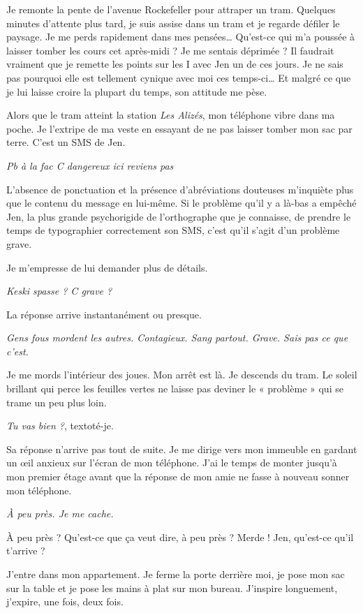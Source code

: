 Je remonte la pente de l'avenue Rockefeller pour attraper un tram. Quelques minutes d'attente plus tard, je suis assise dans un tram et je regarde défiler le paysage. Je me perds rapidement dans mes pensées… Qu'est-ce qui m'a poussée à laisser tomber les cours cet après-midi ? Je me sentais déprimée ? Il faudrait vraiment que je remette les points sur les I avec Jen un de ces jours. Je ne sais pas pourquoi elle est tellement cynique avec moi ces temps-ci… Et malgré ce que je lui laisse croire la plupart du temps, son attitude me pèse.

Alors que le tram atteint la station \textit{Les Alizés}, mon téléphone vibre dans ma poche. Je l'extripe de ma veste en essayant de ne pas laisser tomber mon sac par terre. C'est un SMS de Jen.

\textit{Pb à la fac C dangereux ici reviens pas}

L'absence de ponctuation et la présence d'abréviations douteuses m'inquiète plus que le contenu du message en lui-même. Si le problème qu'il y a là-bas a empêché Jen, la plus grande psychorigide de l'orthographe que je connaisse, de prendre le temps de typographier correctement son SMS, c'est qu'il s'agit d'un problème grave.

Je m'empresse de lui demander plus de détails.

\textit{Keski spasse ? C grave ?}

La réponse arrive instantanément ou presque.

\textit{Gens fous mordent les autres. Contagieux. Sang partout. Grave. Sais pas ce que c'est.}

Je me mords l'intérieur des joues. Mon arrêt est là. Je descends du tram. Le soleil brillant qui perce les feuilles vertes ne laisse pas deviner le « problème » qui se trame un peu plus loin.

\textit{Tu vas bien ?}, textoté-je.

Sa réponse n'arrive pas tout de suite. Je me dirige vers mon immeuble en gardant un œil anxieux sur l'écran de mon téléphone. J'ai le temps de monter jusqu'à mon premier étage avant que la réponse de mon amie ne fasse à nouveau sonner mon téléphone.

\textit{À peu près. Je me cache.}

À peu près ? Qu'est-ce que ça veut dire, à peu près ? Merde ! Jen, qu'est-ce qu'il t'arrive ?

J'entre dans mon appartement. Je ferme la porte derrière moi, je pose mon sac sur la table et je pose les mains à plat sur mon bureau. J'inspire longuement, j'expire, une fois, deux fois.

